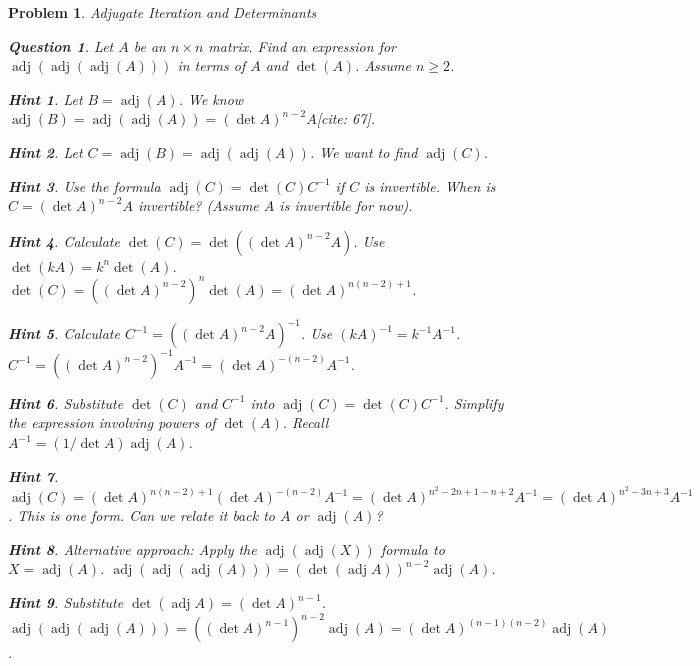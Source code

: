 \documentclass[12pt]{article}
\newtheorem{problem}{Problem}[section]
\newtheorem{question}{Question}[problem]
\theoremstyle{definition}
\newtheorem{hint}{Hint}[question]
\newcommand{\adj}{\operatorname{adj}}
\newcommand{\detm}{\operatorname{det}}
\begin{document}
\begin{problem}{Adjugate Iteration and Determinants}
    \begin{question}
        Let $A$ be an $n \times n$ matrix. Find an expression for $\adj(\adj(\adj(A)))$ in terms of $A$ and $\detm(A)$. Assume $n \ge 2$.
    \end{question}
    \begin{hint}
        Let $B = \adj(A)$. We know $\adj(B) = \adj(\adj(A)) = (\detm A)^{n-2} A$[cite: 67].
    \end{hint}
    \begin{hint}
        Let $C = \adj(B) = \adj(\adj(A))$. We want to find $\adj(C)$.
    \end{hint}
    \begin{hint}
        Use the formula $\adj(C) = \detm(C) C^{-1}$ if $C$ is invertible. When is $C = (\detm A)^{n-2} A$ invertible? (Assume $A$ is invertible for now).
    \end{hint}
    \begin{hint}
        Calculate $\detm(C) = \detm((\detm A)^{n-2} A)$. Use $\detm(kA)=k^n \detm(A)$.
        $\detm(C) = ((\detm A)^{n-2})^n \detm(A) = (\detm A)^{n(n-2)+1}$.
    \end{hint}
    \begin{hint}
        Calculate $C^{-1} = ((\detm A)^{n-2} A)^{-1}$. Use $(kA)^{-1} = k^{-1} A^{-1}$.
        $C^{-1} = ((\detm A)^{n-2})^{-1} A^{-1} = (\detm A)^{-(n-2)} A^{-1}$.
    \end{hint}
    \begin{hint}
        Substitute $\detm(C)$ and $C^{-1}$ into $\adj(C) = \detm(C) C^{-1}$. Simplify the expression involving powers of $\detm(A)$. Recall $A^{-1} = (1/\detm A) \adj(A)$.
    \end{hint}
    \begin{hint}
        $\adj(C) = (\detm A)^{n(n-2)+1} (\detm A)^{-(n-2)} A^{-1} = (\detm A)^{n^2-2n+1 -n+2} A^{-1} = (\detm A)^{n^2-3n+3} A^{-1}$.
        This is one form. Can we relate it back to $A$ or $\adj(A)$?
    \end{hint}
    \begin{hint}
        Alternative approach: Apply the $\adj(\adj(X))$ formula to $X = \adj(A)$.
        $\adj(\adj(\adj(A))) = (\detm(\adj A))^{n-2} \adj(A)$.
    \end{hint}
    \begin{hint}
        Substitute $\detm(\adj A) = (\detm A)^{n-1}$.
        $\adj(\adj(\adj(A))) = ((\detm A)^{n-1})^{n-2} \adj(A) = (\detm A)^{(n-1)(n-2)} \adj(A)$.

\end{hint}
\end{problem}
\end{document}
